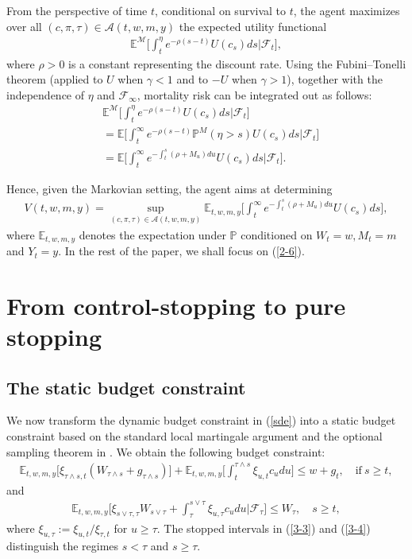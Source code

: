 \documentclass[a4paper,11pt]{amsart}
\numberwithin{equation}{section}
\newcommand{\blue}[1]{{\color{black}#1}}
\begin{document}
{\color{black}
From the perspective of time $t$, conditional on survival to $t$, the agent maximizes over all $(c,\pi,\tau)\in\mathcal{A}(t,w,m,y)$ the expected  utility functional
\begin{align*}
\mathbb{E}^{\mathcal{M}}\bigg[\int_t^{\eta}e^{-\rho(s-t)}U(c_s)ds\bigg|\mathcal{F}_t\bigg],
\end{align*}
where $\rho>0$ is a constant representing the discount rate. Using the Fubini--Tonelli theorem (applied to $U$ when $\gamma<1$ and to $-U$ when $\gamma>1$), together with the independence of $\eta$ and $\mathcal{F}_\infty$, mortality risk can be integrated out as follows:
\begin{align*}
&\mathbb{E}^{\mathcal{M}}\bigg[\int_t^{\eta}e^{-\rho(s-t)}U(c_s)ds\bigg|\mathcal{F}_t\bigg]\\
&=\mathbb{E}\bigg[\int_t^\infty e^{-\rho(s-t)}\mathbb{P}^M(\eta>s)U(c_s)ds\bigg|\mathcal{F}_t\bigg]\\
&=\mathbb{E}\bigg[\int_t^\infty e^{-\int_t^s(\rho+M_u)du}U(c_s)ds\bigg|\mathcal{F}_t\bigg].
\end{align*} 
}



Hence, given the Markovian setting, the agent aims at determining
\begin{align}\label{2-6}
V(t,w,m,y)=\sup_{(c, \pi,\tau) \in \mathcal{A}(t,w,m,y) } \mathbb{E}_{t,w,m,y}\bigg[  \int_t^{ \infty } e^{- \int^s_t  (\rho +M_u)du}U(c_s)  ds  \bigg],
\end{align}
where $ \mathbb{E}_{t,w,m,y}$ \blue{denotes} the expectation under $\mathbb{P}$ conditioned on  $W_t=w, M_t=m$ and $Y_t=y$. In the rest of the paper, we shall focus on (\ref{2-6}).

		\section{From control-stopping to pure stopping}\label{sec3}
		
		\subsection{The static budget constraint}
		We now transform the dynamic budget constraint in (\ref{sde}) into a static budget constraint based on the standard local martingale argument and the \blue{optional} sampling theorem in \citet{karatzas2000utility}. We obtain the following budget constraint: 
		\begin{align}\label{3-3}
\mathbb{E}_{t,w,m,y}\big[{\xi_{ \tau \wedge s ,t}}(W_{\tau \wedge s }+g_{  \tau \wedge s })\big]+\mathbb{E}_{t,w,m,y}\bigg[ \int_t^{ \tau \wedge s} \xi_{u,t} c_u du                         \bigg]  \leq w+g_t, \quad \text{if} \ s\geq t,
		\end{align}
		and		\blue{\begin{align}\label{3-4}
\mathbb{E}_{t,w,m,y}\bigg[\xi_{s\vee\tau,\tau}W_{s\vee\tau}+\int_\tau^{s\vee\tau}\xi_{u,\tau}c_udu\bigg|\mathcal F_\tau\bigg]\leq W_\tau,\quad s\geq t,
		\end{align}	
		where $\xi_{u,\tau}:=\xi_{u,t}/\xi_{\tau,t}$ for $u\geq\tau$. The stopped intervals in (\ref{3-3}) and (\ref{3-4}) distinguish the regimes $s<\tau$ and $s\geq\tau$.}
		
\end{document}
